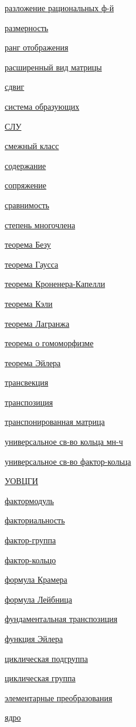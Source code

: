 \documentclass[a4paper,100pt]{article}
\theoremstyle{indented}
\theoremstyle{definition}
\theoremstyle{remark}
\begin{document}
\begin{multicols}{2}
    \hyperlink{n41}{разложение рациональных ф-й}\

    \hyperlink{n47}{размерность}\

    \hyperlink{n53}{ранг отображения}\

    \hyperlink{n63}{расширенный вид матрицы}\

    \hyperlink{n79}{сдвиг}\

    \hyperlink{n44}{система образующих}\

    \hyperlink{n62}{СЛУ}\

    \hyperlink{n88}{смежный класс}\

    \hyperlink{n30}{содержание}\

    \hyperlink{n81}{сопряжение}\

    \hyperlink{n23}{сравнимость}\

    \hyperlink{n29}{степень многочлена}\

    \hyperlink{n34}{теорема Безу}\

    \hyperlink{n32}{теорема Гаусса}\

    \hyperlink{n64}{теорема Кроненера-Капелли}\

    \hyperlink{n80}{теорема Кэли}\

    \hyperlink{n90}{теорема Лагранжа}\

    \hyperlink{n25}{теорема о гомоморфизме}\

    \hyperlink{n91}{теорема Эйлера}\

    \hyperlink{n57}{трансвекция}\

    \hyperlink{n74}{транспозиция}\

    \hyperlink{n103}{транспонированная матрица}\

    \hyperlink{n33}{универсальное св-во кольца мн-ч}\

    \hyperlink{n26}{универсальное св-во фактор-кольца}\

    \hyperlink{n11}{УОВЦГИ}\

    \hyperlink{n50}{фактормодуль}\

    \hyperlink{n12}{факториальность}\

    \hyperlink{n94}{фактор-группа}\

    \hyperlink{n24}{фактор-кольцо}\

    \hyperlink{n102}{формула Крамера}\

    \hyperlink{n98}{формула Лейбница}\

    \hyperlink{n75}{фундаментальная транспозиция}\

    \hyperlink{n85}{функция Эйлера}\

    \hyperlink{n68}{циклическая подгруппа}\

    \hyperlink{n67}{циклическая группа}\

    \hyperlink{n59}{элементарные преобразования}\

    \hyperlink{n20}{ядро}\
    

\end{multicols}
\end{document}
